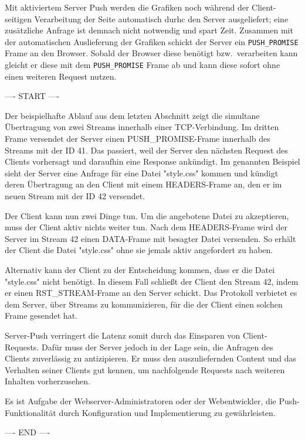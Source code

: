 \documentclass[a4paper, justified, notoc]{tufte-handout} %
\begin{document}
Mit aktiviertem Server Push werden die Grafiken noch während der Client-seitigen Verarbeitung der Seite automatisch durhc den Server ausgeliefert; eine zusätzliche Anfrage ist demnach nicht notwendig und spart Zeit. Zusammen mit der automatischen Auslieferung der Grafiken schickt der Server ein \texttt{PUSH\_PROMISE} Frame an den Browser. Sobald der Browser diese benötigt bzw.\ verarbeiten kann gleicht er diese mit dem \texttt{PUSH\_PROMISE} Frame ab und kann diese sofort ohne einen weiteren Request nutzen. 


---- START ----

Der beispielhafte Ablauf aus dem letzten Abschnitt zeigt die simultane Übertragung von zwei Streams innerhalb einer TCP-Verbindung. Im dritten Frame versendet der Server einen PUSH\_PROMISE-Frame innerhalb des Streams mit der ID 41. Das passiert, weil der Server den nächsten Request des Clients vorhersagt und daraufhin eine Response ankündigt. Im genannten Beispiel sieht der Server eine Anfrage für eine Datei "style.css" kommen und kündigt deren Übertragung an den Client mit einem HEADERS-Frame an, den er im neuen Stream mit der ID 42 versendet.

Der Client kann nun zwei Dinge tun. Um die angebotene Datei zu akzeptieren, muss der Client aktiv nichts weiter tun. Nach dem HEADERS-Frame wird der Server im Stream 42 einen DATA-Frame mit besagter Datei versenden. So erhält der Client die Datei "style.css" ohne sie jemals aktiv angefordert zu haben.

Alternativ kann der Client zu der Entscheidung kommen, dass er die Datei "style.css" nicht benötigt. In diesem Fall schließt der Client den Stream 42, indem er einen RST\_STREAM-Frame an den Server schickt. Das Protokoll verbietet es dem Server, über Streams zu kommunizieren, für die der Client einen solchen Frame gesendet hat.

Server-Push verringert die Latenz somit durch das Einsparen von Client-Requests. Dafür muss der Server jedoch in der Lage sein, die Anfragen des Clients zuverlässig zu antizipieren. Er muss den auszuliefernden Content und das Verhalten seiner Clients gut kennen, um nachfolgende Requests nach weiteren Inhalten vorherzusehen.

Es ist Aufgabe der Webserver-Administratoren oder der Webentwickler, die Push-Funktionalität durch Konfiguration und Implementierung zu gewährleisten.

---- END ----


\newpage

\end{document}
